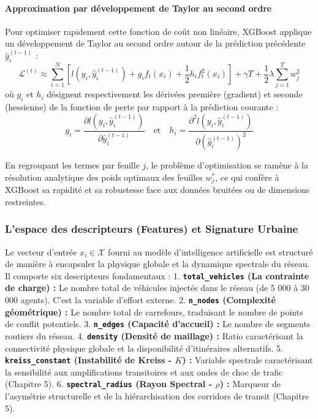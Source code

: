 \documentclass[10pt, a4paper]{article}
\begin{document}
\paragraph{Approximation par développement de Taylor au second
ordre}\label{approximation-par-duxe9veloppement-de-taylor-au-second-ordre}

Pour optimiser rapidement cette fonction de coût non linéaire, XGBoost
applique un développement de Taylor au second ordre autour de la
prédiction précédente \(\hat{y}_i^{(t-1)}\) :
\[\mathcal{L}^{(t)} \approx \sum_{i=1}^N \left[ l\left(y_i, \hat{y}_i^{(t-1)}\right) + g_i f_t(x_i) + \frac{1}{2} h_i f_t^2(x_i) \right] + \gamma T + \frac{1}{2} \lambda \sum_{j=1}^T w_j^2\]
où \(g_i\) et \(h_i\) désignent respectivement les dérivées première
(gradient) et seconde (hessienne) de la fonction de perte par rapport à
la prédiction courante :
\[g_i = \frac{\partial l\left(y_i, \hat{y}_i^{(t-1)}\right)}{\partial \hat{y}_i^{(t-1)}} \quad \text{et} \quad h_i = \frac{\partial^2 l\left(y_i, \hat{y}_i^{(t-1)}\right)}{\partial \left(\hat{y}_i^{(t-1)}\right)^2}\]

En regroupant les termes par feuille \(j\), le problème d'optimisation
se ramène à la résolution analytique des poids optimaux des feuilles
\(w_j^*\), ce qui confère à XGBoost sa rapidité et sa robustesse face
aux données bruitées ou de dimensions restreintes.

\subsubsection{L'espace des descripteurs (Features) et Signature
Urbaine}\label{lespace-des-descripteurs-features-et-signature-urbaine}

Le vecteur d'entrée \(x_i \in \mathcal{X}\) fourni au modèle
d'intelligence artificielle est structuré de manière à encapsuler la
physique globale et la dynamique spectrale du réseau. Il comporte six
descripteurs fondamentaux : 1. \textbf{\texttt{total\_vehicles} (La
contrainte de charge) :} Le nombre total de véhicules injectés dans le
réseau (de 5 000 à 30 000 agents). C'est la variable d'effort externe.
2. \textbf{\texttt{n\_nodes} (Complexité géométrique) :} Le nombre total
de carrefours, traduisant le nombre de points de conflit potentiels. 3.
\textbf{\texttt{n\_edges} (Capacité d'accueil) :} Le nombre de segments
routiers du réseau. 4. \textbf{\texttt{density} (Densité de maillage) :}
Ratio caractérisant la connectivité physique globale et la disponibilité
d'itinéraires alternatifs. 5. \textbf{\texttt{kreiss\_constant}
(Instabilité de Kreiss - \(K\)) :} Variable spectrale caractérisant la
sensibilité aux amplifications transitoires et aux ondes de choc de
trafic (Chapitre 5). 6. \textbf{\texttt{spectral\_radius} (Rayon
Spectral - \(\rho\)) :} Marqueur de l'asymétrie structurelle et de la
hiérarchisation des corridors de transit (Chapitre 5).
\end{document}
